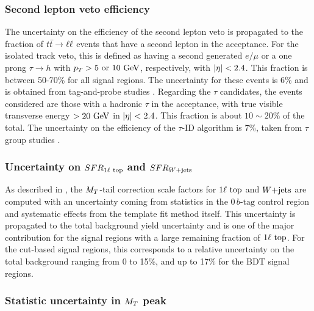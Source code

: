     \subsubsection{Second lepton veto efficiency}

    The uncertainty on the efficiency of the second lepton veto is propagated to
    the fraction of $t\bar{t} \rightarrow \ell \ell$ events that have a second lepton in the
    acceptance. For the isolated track veto, this is defined as having a second
    generated $e/\mu$ or a one prong $\tau \rightarrow h$ with $p_T > 5 \text{
    or } 10 ~\text{GeV}$, respectively, with $\left| \eta \right| < 2.4$. This fraction is between
    50-70\% for all signal regions. The uncertainty for these events is 6\% and
    is obtained from tag-and-probe studies \cite{AN-2013-89}. Regarding the
    $\tau$ candidates, the events considered are those with a hadronic $\tau$ in
    the acceptance, with true visible transverse energy $> 20~\text{GeV}$ in $\left| \eta \right| <
    2.4$. This fraction is about $10 \sim 20 \%$ of the total. The uncertainty
    on the efficiency of the $\tau$-ID algorithm is 7\%, taken from $\tau$ group
    studies \cite{TauID}.

    \subsubsection{Uncertainty on $SFR_{1\ell~\text{top}}$ and $SFR_{\text{$W$+jets}}$}

    As described in , the $M_T$-tail correction
    scale factors for $1\ell~\text{top}$ and $\text{$W$+jets}$ are computed with an
    uncertainty coming from statistics in the $0\, b\text{-tag}$ control region
    and systematic effects from the template fit method itself. This uncertainty
    is propagated to the total background yield uncertainty and is one of the
    major contribution for the signal regions with a large remaining fraction of
    $1\ell~\text{top}$.  For the cut-based signal regions, this corresponds to a
    relative uncertainty on the total background ranging from 0 to 15\%, and up
    to 17\% for the BDT signal regions.

    \subsubsection{Statistic uncertainty in $M_T$ peak}

